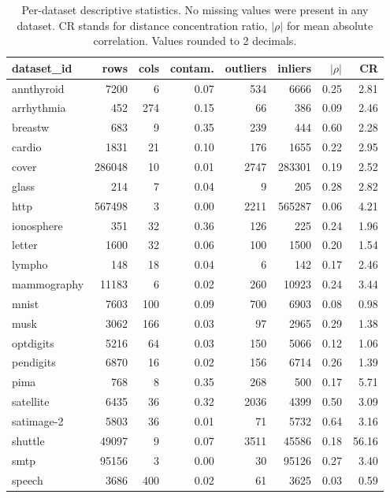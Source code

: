 \documentclass[cameraready]{Interspeech}
\begin{document}
\begin{table}[!ht]
\scriptsize
\centering
\caption{Per-dataset descriptive statistics. No missing values were present in any dataset. CR stands for distance concentration ratio, $|\rho|$ for mean absolute correlation. Values rounded to 2 decimals.}\label{tab:dataset-full}
\setlength{\tabcolsep}{3pt}
\begin{tabular}{lrrrrrrr}
\toprule
\textbf{dataset\_id} & \textbf{rows} & \textbf{cols} & \textbf{contam.} & \textbf{outliers} & \textbf{inliers} & \textbf{$|\rho|$} & \textbf{CR} \\
\midrule
annthyroid & 7200 & 6 & 0.07 & 534 & 6666 & 0.25 & 2.81 \\
arrhythmia & 452 & 274 & 0.15 & 66 & 386 & 0.09 & 2.46 \\
breastw & 683 & 9 & 0.35 & 239 & 444 & 0.60 & 2.28 \\
cardio & 1831 & 21 & 0.10 & 176 & 1655 & 0.22 & 2.95 \\
cover & 286048 & 10 & 0.01 & 2747 & 283301 & 0.19 & 2.52 \\
glass & 214 & 7 & 0.04 & 9 & 205 & 0.28 & 2.82 \\
http & 567498 & 3 & 0.00 & 2211 & 565287 & 0.06 & 4.21 \\
ionosphere & 351 & 32 & 0.36 & 126 & 225 & 0.24 & 1.96 \\
letter & 1600 & 32 & 0.06 & 100 & 1500 & 0.20 & 1.54 \\
lympho & 148 & 18 & 0.04 & 6 & 142 & 0.17 & 2.46 \\
mammography & 11183 & 6 & 0.02 & 260 & 10923 & 0.24 & 3.44 \\
mnist & 7603 & 100 & 0.09 & 700 & 6903 & 0.08 & 0.98 \\
musk & 3062 & 166 & 0.03 & 97 & 2965 & 0.29 & 1.38 \\
optdigits & 5216 & 64 & 0.03 & 150 & 5066 & 0.12 & 1.06 \\
pendigits & 6870 & 16 & 0.02 & 156 & 6714 & 0.26 & 1.39 \\
pima & 768 & 8 & 0.35 & 268 & 500 & 0.17 & 5.71 \\
satellite & 6435 & 36 & 0.32 & 2036 & 4399 & 0.50 & 3.09 \\
satimage-2 & 5803 & 36 & 0.01 & 71 & 5732 & 0.64 & 3.16 \\
shuttle & 49097 & 9 & 0.07 & 3511 & 45586 & 0.18 & 56.16 \\
smtp & 95156 & 3 & 0.00 & 30 & 95126 & 0.27 & 3.40 \\
speech & 3686 & 400 & 0.02 & 61 & 3625 & 0.03 & 0.59 \\

\end{tabular}
\end{table}
\end{document}
